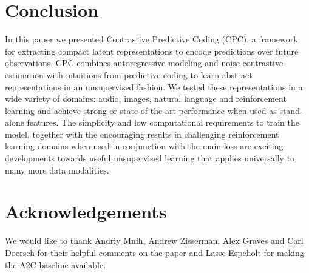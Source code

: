 \section{Conclusion}

In this paper we presented Contrastive Predictive Coding (CPC), a framework for extracting compact latent representations to encode predictions over future observations. CPC combines autoregressive modeling and noise-contrastive estimation with intuitions from predictive coding to learn abstract representations in an unsupervised fashion. 
We tested these representations in a wide variety of domains: audio, images, natural language and reinforcement learning and achieve strong or state-of-the-art performance when used as stand-alone features. The simplicity and low computational requirements to train the model, together with the encouraging results in challenging reinforcement learning domains when used in conjunction with the main loss are exciting developments towards useful unsupervised learning that applies universally to many more data modalities.

\section{Acknowledgements}

We would like to thank Andriy Mnih, Andrew Zisserman, Alex Graves and Carl Doersch for their helpful comments on the paper and Lasse Espeholt for making the A2C baseline available.